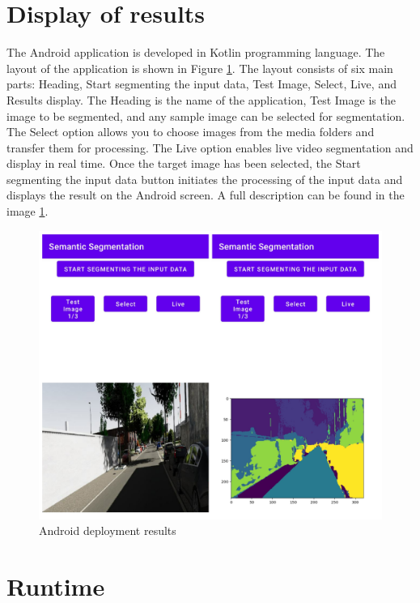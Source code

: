     \section{Display of results}
	
	The Android application is developed in Kotlin programming language. The layout of the application is shown in Figure \ref{fig:android_result}. The layout consists of six main parts: Heading, Start segmenting the input data, Test Image, Select, Live, and Results display. The Heading is the name of the application, Test Image is the image to be segmented, and any sample image can be selected for segmentation. The Select option allows you to choose images from the media folders and transfer them for processing. The Live option enables live video segmentation and display in real time. Once the target image has been selected, the Start segmenting the input data button initiates the processing of the input data and displays the result on the Android screen. A full description can be found in the image \ref{fig:android_result}. 
	
	\begin{figure}
		\centering
		\includegraphics[width=13cm]{images/android_ss.jpg}
		\caption{Android deployment results}
		\label{fig:android_result}
	\end{figure}
    
    \newpage
    \section{Runtime}

